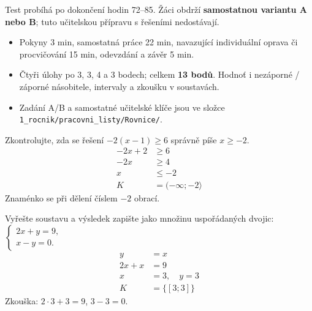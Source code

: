 \documentclass[11pt,a4paper]{article}
\begin{document}
Test probíhá po dokončení hodin 72--85. Žáci obdrží \textbf{samostatnou variantu A nebo B}; tuto učitelskou přípravu s řešeními nedostávají.
\begin{itemize}
\item Pokyny 3 min, samostatná práce 22 min, navazující individuální oprava či procvičování 15 min, odevzdání a závěr 5 min.
\item Čtyři úlohy po 3, 3, 4 a 3 bodech; celkem \textbf{13 bodů}. Hodnoť i nezáporné / záporné násobitele, intervaly a zkoušku v soustavách.
\item Zadání A/B a samostatné učitelské klíče jsou ve složce \texttt{1\_rocnik/pracovni\_listy/Rovnice/}.
\end{itemize}
\begin{prikladReseniBox}[title={Příklad 1}]
Zkontrolujte, zda se řešení $-2(x-1)\ge6$ správně píše $x\ge-2$.
\tcblower
\[\begin{aligned}
-2x+2&\ge6 \\
-2x&\ge4 \\
x&\le-2 \\
K&=(-\infty;-2\rangle
\end{aligned}\]
Znaménko se při dělení číslem $-2$ obrací.
\end{prikladReseniBox}
\begin{zadaniReseniBox}[title={Samostatná práce 1}]
Vyřešte soustavu a výsledek zapište jako množinu uspořádaných dvojic: $\begin{cases}2x+y=9,\\x-y=0.\end{cases}$
\tcblower
\[\begin{aligned}
y&=x \\
2x+x&=9 \\
x&=3,\quad y=3 \\
K&=\{[3;3]\}
\end{aligned}\]
Zkouška: $2\cdot3+3=9$, $3-3=0$.
\end{zadaniReseniBox}
\end{document}

